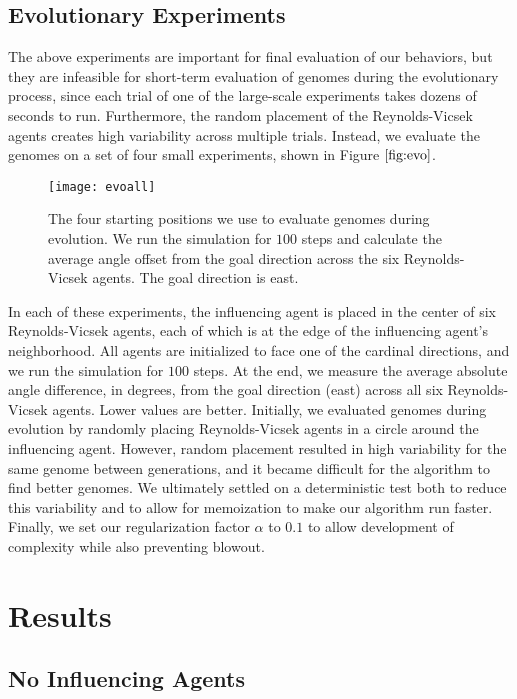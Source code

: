 \subsection{Evolutionary Experiments}
The above experiments are important for final evaluation of our behaviors, but
they are infeasible for short-term evaluation of genomes during
the evolutionary process, since each trial of one of the large-scale
experiments takes dozens of seconds to run.
Furthermore, the random placement of the Reynolds-Vicsek agents creates high
variability across multiple trials.
Instead, we evaluate the genomes on a set of four small experiments, shown in
Figure $\ref{fig:evo}$.
\begin{figure}
    \centering
    \texttt{[image: evoall]}
    \caption{The four starting positions we use to evaluate genomes during
    evolution.
    We run the simulation for $100$ steps and calculate the average angle offset
    from the goal direction across the six Reynolds-Vicsek agents.
    The goal direction is east.}
    \label{fig:evo}
\end{figure}
In each of these experiments, the influencing agent is placed in the center of
six Reynolds-Vicsek agents, each of which is at the edge of the influencing
agent's neighborhood.
All agents are initialized to face one of the cardinal directions, and we run
the simulation for $100$ steps.
At the end, we measure the average absolute angle difference, in degrees, from
the goal direction (east) across all six Reynolds-Vicsek agents.
Lower values are better.
Initially, we evaluated genomes during evolution by randomly placing
Reynolds-Vicsek agents in a circle around the influencing agent.
However, random placement resulted in high variability for the same genome
between generations, and it became difficult for the algorithm to find better
genomes.
We ultimately settled on a deterministic test both to reduce this variability
and to allow for memoization to make our algorithm run faster.
Finally, we set our regularization factor $\alpha$ to $0.1$ to allow
development of complexity while also preventing blowout.

\section{Results}
\subsection{No Influencing Agents}

